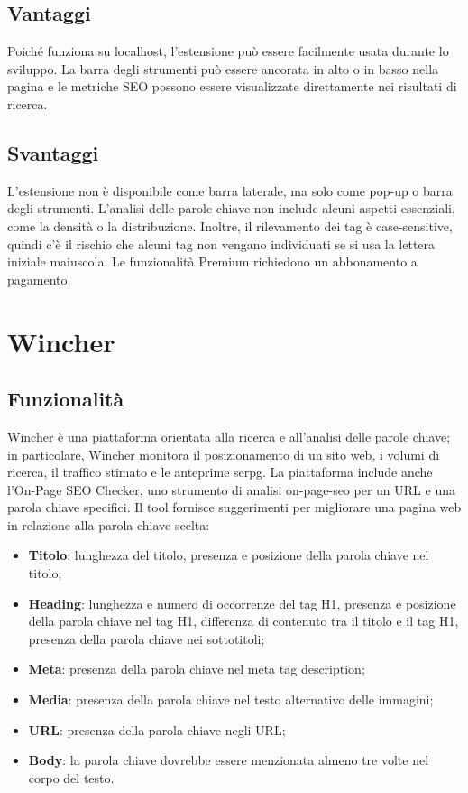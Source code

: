 \subsection{Vantaggi}
\par Poiché funziona su \gls{localhost}, l'estensione può essere facilmente usata durante lo sviluppo. La barra degli strumenti può essere ancorata in alto o in basso nella pagina e le metriche SEO possono essere visualizzate direttamente nei risultati di ricerca.

\subsection{Svantaggi}
\par L'estensione non è disponibile come barra laterale, ma solo come pop-up o barra degli strumenti. L'analisi delle parole chiave non include alcuni aspetti essenziali, come la densità o la distribuzione. Inoltre, il rilevamento dei tag è \gls{case-sensitive}, quindi c'è il rischio che alcuni tag non vengano individuati se si usa la lettera iniziale maiuscola. Le funzionalità Premium richiedono un abbonamento a pagamento. 

\section{Wincher}

\subsection{Funzionalità}
\par Wincher è una piattaforma orientata alla ricerca e all'analisi delle parole chiave; in particolare, Wincher monitora il posizionamento di un sito web, i volumi di ricerca, il traffico stimato e le anteprime \gls{serpg}. La piattaforma include anche l'On-Page SEO Checker, uno strumento di analisi \gls{on-page-seo} per un URL e una parola chiave specifici. Il tool fornisce suggerimenti per migliorare una pagina web in relazione alla parola chiave scelta:
\begin{itemize}
    \item \textbf{Titolo}: lunghezza del titolo, presenza e posizione della parola chiave nel titolo;
    \item \textbf{Heading}: lunghezza e numero di occorrenze del tag H1, presenza e posizione della parola chiave nel tag H1, differenza di contenuto tra il titolo e il tag H1, presenza della parola chiave nei sottotitoli;
    \item \textbf{Meta}: presenza della parola chiave nel meta tag description;
    \item \textbf{Media}: presenza della parola chiave nel testo alternativo delle immagini;
    \item \textbf{URL}: presenza della parola chiave negli URL;
    \item \textbf{Body}: la parola chiave dovrebbe essere menzionata almeno tre volte nel corpo del testo.
\end{itemize}

